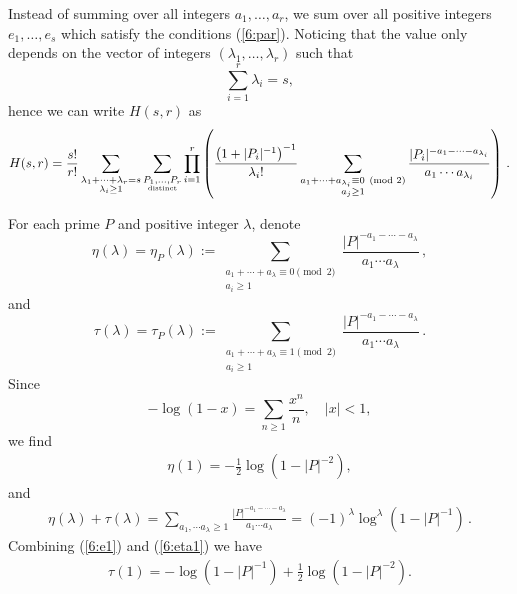 \documentclass[12pt]{amsart}
\theoremstyle{plain}
\begin{document}
Instead of summing over all integers $a_1,\ldots,a_r$, we sum over all positive integers $e_1,\ldots,e_s$ which satisfy the conditions (\ref{6:par}). Noticing that the value only depends on the vector of integers $(\lambda_1,\ldots,\lambda_r)$ such that
\[\sum_{i=1}^r \lambda_i=s,\]
hence we can write $H(s,r)$ as
\[H(s,r)=\frac{s!}{r!}\sum_{\substack{\lambda_1+\cdots+\lambda_r=s\\ \lambda_i \ge 1}}\sum_{\substack{P_1,\ldots,P_r\\ \mbox{\tiny distinct}}} \prod_{i=1}^r\left(\frac{\left(1+|P_i|^{-1}\right)^{-1}}{\lambda_i !} \sum_{\substack{a_1+ \cdots+a_{\lambda_i} \equiv 0 \pmod{2} \\ a_j \ge 1}} \frac{|P_i|^{-a_1-\cdots-a_{\lambda_i}}}{a_1 \cdots a_{\lambda_i}}\right)\,.\]


For each prime $P$ and positive integer $\lambda$, denote
\[\eta(\lambda)=\eta_P(\lambda):=\sum_{\substack{a_1+ \cdots+a_{\lambda} \equiv 0 \pmod{2} \\ a_i \ge 1}} \frac{|P|^{-a_1-\cdots-a_{\lambda}}}{a_1 \cdots a_{\lambda}}\,,\]
and
\[\tau(\lambda)=\tau_P(\lambda):=\sum_{\substack{a_1+ \cdots+a_{\lambda} \equiv 1 \pmod{2} \\ a_i \ge 1}} \frac{|P|^{-a_1-\cdots-a_{\lambda}}}{a_1 \cdots a_{\lambda}}\,.\]
Since
\[-\log (1-x)=\sum_{n \ge 1} \frac{x^n}{n}, \quad |x|<1, \]
we find
\begin{eqnarray} \label{6:e1}
\eta(1)=- \frac{1}{2}\log \left(1-|P|^{-2}\right),
\end{eqnarray}
and
\begin{eqnarray} \label{6:eta1} \eta(\lambda)+\tau(\lambda)=\sum_{a_1, \cdots a_{\lambda} \ge 1 } \frac{|P|^{-a_1-\cdots-a_{\lambda}}}{a_1 \cdots a_{\lambda}}=(-1)^{\lambda}\log^{\lambda}\left(1-|P|^{-1}\right)\,.
\end{eqnarray}
Combining (\ref{6:e1}) and (\ref{6:eta1}) we have
\begin{eqnarray*}
\tau(1)=-\log \left(1-|P|^{-1}\right)+ \frac{1}{2}\log \left(1-|P|^{-2}\right).
\end{eqnarray*}
\end{document}
